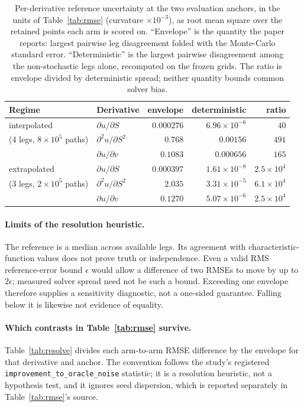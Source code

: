\documentclass{article}
\begin{document}
\begin{table}[!htbp]
\caption{Per-derivative reference uncertainty at the two evaluation anchors, in the
units of Table~\ref{tab:rmse} (curvature $\times 10^{-3}$), as root mean square over
the retained points each arm is scored on. ``Envelope'' is the quantity the paper
reports: largest pairwise leg disagreement folded with the Monte-Carlo standard
error. ``Deterministic'' is the largest pairwise disagreement among the
non-stochastic legs alone, recomputed on the frozen grids. The ratio is envelope
divided by deterministic spread; neither quantity bounds common solver bias.}
\label{tab:spread}
\centering\footnotesize\setlength{\tabcolsep}{5pt}
\begin{tabular}{@{}llrrr@{}}
\toprule
Regime & Derivative & envelope & deterministic & ratio \\
\midrule
interpolated & $\partial u/\partial S$ & $0.000276$ & $6.96\times10^{-6}$ & $40$ \\
(4 legs, $8\times10^{5}$ paths) & $\partial^{2}u/\partial S^{2}$ & $0.768$ & $0.00156$ & $491$ \\
 & $\partial u/\partial v$ & $0.1083$ & $0.000656$ & $165$ \\
\midrule
extrapolated & $\partial u/\partial S$ & $0.000397$ & $1.61\times10^{-8}$ & $2.5\times10^{4}$ \\
(3 legs, $2\times10^{5}$ paths) & $\partial^{2}u/\partial S^{2}$ & $2.035$ & $3.31\times10^{-5}$ & $6.1\times10^{4}$ \\
 & $\partial u/\partial v$ & $0.1270$ & $5.07\times10^{-6}$ & $2.5\times10^{4}$ \\
\bottomrule
\end{tabular}
\end{table}

\paragraph{Limits of the resolution heuristic.} The reference is a median across
available legs. Its agreement with characteristic-function values does not prove
truth or independence. Even a valid RMS reference-error bound $\epsilon$ would
allow a difference of two RMSEs to move by up to $2\epsilon$; measured solver
spread need not be such a bound. Exceeding one envelope therefore supplies a
sensitivity diagnostic, not a one-sided guarantee. Falling below it is likewise
not evidence of equality.

\paragraph{Which contrasts in Table~\ref{tab:rmse} survive.} Table~\ref{tab:resolve}
divides each arm-to-arm RMSE difference by the envelope for that derivative and
anchor. The convention follows the study's registered
\texttt{improvement\_to\_oracle\_noise} statistic; it is a resolution heuristic, not
a hypothesis test, and it ignores seed dispersion, which is reported separately in
Table~\ref{tab:rmse}'s source.
\end{document}
